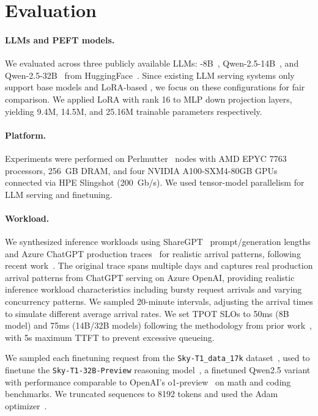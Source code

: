 \section{Evaluation}
\label{sec:eval} 
\paragraph{LLMs and PEFT models.} We evaluated \sys across three publicly available LLMs: -8B~\cite{llama2}, Qwen-2.5-14B~\cite{qwen2025qwen25technicalreport}, and Qwen-2.5-32B~\cite{qwen2025qwen25technicalreport} from HuggingFace~\cite{huggingfacemodels}.
Since existing LLM serving systems only support base models and LoRA-based \peft, we focus on these configurations for fair comparison.
We applied LoRA with rank 16 to MLP down projection layers, yielding 9.4M, 14.5M, and 25.16M trainable parameters respectively.

\paragraph{Platform.} Experiments were performed on Perlmutter~\cite{perlmutter} nodes with AMD EPYC 7763 processors, \SI{256}{GB} DRAM, and four NVIDIA A100-SXM4-80GB GPUs connected via HPE Slingshot (\SI{200}{Gb/s}). We used tensor-model parallelism for LLM serving and finetuning.

\paragraph{Workload.} 
We synthesized inference workloads using ShareGPT~\cite{sharegpt} prompt/generation lengths and Azure ChatGPT production traces~\cite{burstgpt} for realistic arrival patterns, following recent work~\cite{10.1145/3600006.3613165, zhong2024distserve, agrawal2023sarathi, nanoflow, pipellm, medusa}. The original trace spans multiple days and captures real production arrival patterns from ChatGPT serving on Azure OpenAI, providing realistic inference workload characteristics including bursty request arrivals and varying concurrency patterns.  We sampled 20-minute intervals, adjusting the arrival times to simulate different average arrival rates.
We set TPOT SLOs to 50ms (8B model) and 75ms (14B/32B models) following the methodology from prior work~\cite{agrawal2023sarathi}, with 5s maximum TTFT to prevent excessive queueing.

We sampled each finetuning request from the \texttt{Sky-T1\_data\_17k} dataset~\cite{novasky2025dataset}, used to finetune the \texttt{Sky-T1-32B-Preview} reasoning model~\cite{novasky2025model}, a finetuned Qwen2.5 variant with performance comparable to OpenAI's o1-preview~\cite{o1-preview} on math and coding benchmarks. We truncated sequences to 8192 tokens and used the Adam optimizer~\cite{kingma2014adam}.

